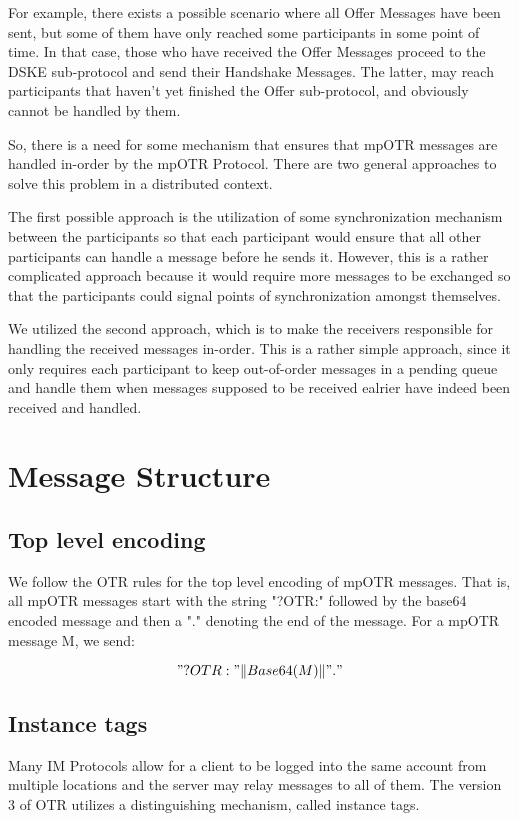 For example, there exists a possible scenario where all Offer Messages have been sent, but some of them have only reached some participants in some point of time. In that case, those who have received the Offer Messages proceed to the DSKE sub-protocol and send their Handshake Messages. The latter, may reach participants that haven't yet finished the Offer sub-protocol, and obviously cannot be handled by them.

So, there is a need for some mechanism that ensures that mpOTR messages are handled in-order by the mpOTR Protocol. There are two general approaches to solve this problem in a distributed context.

The first possible approach is the utilization of some synchronization mechanism between the participants so that each participant would ensure that all other participants can handle a message before he sends it. However, this is a rather complicated approach because it would require more messages to be exchanged so that the participants could signal points of synchronization amongst themselves.

We utilized the second approach, which is to make the receivers responsible for handling the received messages in-order. This is a rather simple approach, since it only requires each participant to keep out-of-order messages in a pending queue and handle them when messages supposed to be received ealrier have indeed been received and handled.



\section{Message Structure}
\label{sections:message_structure}

\subsection{Top level encoding}
We follow the OTR rules for the top level encoding of mpOTR messages. That is, all mpOTR messages start with the string "?OTR:" followed by the base64 encoded message and then a "." denoting the end of the message. For a mpOTR message M, we send:

\[ 
  "?OTR:" \Vert Base64(M) \Vert "."
\]

\subsection{Instance tags}
\label{subsections:instance_tags}
Many IM Protocols allow for a client to be logged into the same account from multiple locations and the server may relay messages to all of them. The version 3 of OTR utilizes a distinguishing mechanism, called instance tags.

